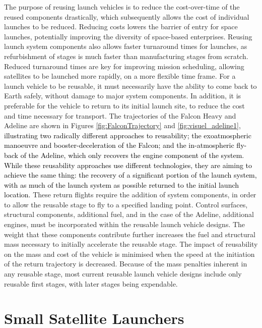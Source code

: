     The purpose of reusing launch vehicles is to reduce the cost-over-time of the reused components drastically, which subsequently allows the cost of individual launches to be reduced\cite{RichardWebb2016}. Reducing costs lowers the barrier of entry for space launches, potentially improving the diversity of space-based enterprises. 
    Reusing launch system components also allows faster turnaround times for launches, as refurbishment of stages is much faster than manufacturing stages from scratch. Reduced turnaround times are key for improving mission scheduling, allowing satellites to be launched more rapidly, on a more flexible time frame. 
    For a launch vehicle to be reusable, it must necessarily have the ability to come back to Earth safely, without damage to major system components. In addition, it is preferable for the vehicle to return to its initial launch site, to reduce the cost and time necessary for transport. The trajectories of the Falcon Heavy and Adeline are shown in Figures \ref{fig:FalconTrajectory} and \ref{fig:visuel_adeline1}, \textcolor{black}{ illustrating two radically different approaches to reusability; the exoatmospheric manoeuvre and booster-deceleration of the Falcon; and the in-atmospheric fly-back of the Adeline, which only recovers the engine component of the system. While these reusability approaches use different technologies, they are aiming to achieve the same thing: the recovery of a significant portion of the launch system, with as much of the launch system as possible returned to the initial launch location.} These return flights require the addition of system components, in order to allow the reusable stage to fly to a specified landing point. Control surfaces\cite{Clark2018}, structural components\cite{Sarigul2003}, additional fuel\cite{Sarigul2003}, and in the case of the Adeline, additional engines\cite{Adeline}, must be incorporated within the reusable launch vehicle designs. The weight that these components contribute further increases the fuel and structural mass necessary to initially accelerate the reusable stage. The impact of reusability on the mass and cost of the vehicle is minimised when the speed at the initiation of the return trajectory is decreased. Because of the mass penalties inherent in any reusable stage, most current reusable launch vehicle designs include only reusable first stages, with later stages being expendable. 
    
    
    
    
    \section{Small Satellite Launchers}\label{subsec:smallsats}
    
